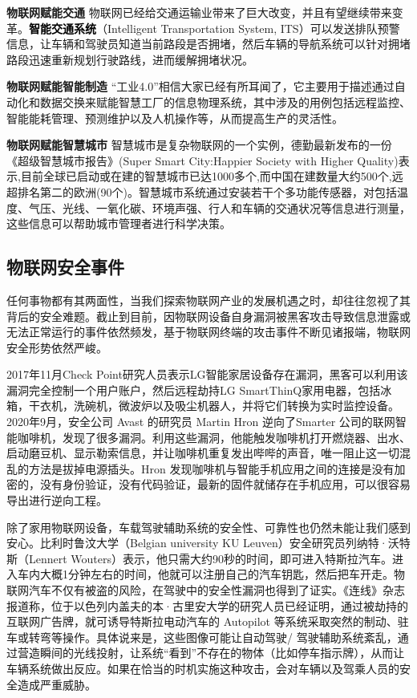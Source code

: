 \textcolor{myblue}{\textbf{物联网赋能交通}}\quad
物联网已经给交通运输业带来了巨大改变，并且有望继续带来变革。\textcolor{black}{\textbf{智能交通系统}}（Intelligent Transportation System, ITS）可以发送排队预警信息，让车辆和驾驶员知道当前路段是否拥堵，然后车辆的导航系统可以针对拥堵路段迅速重新规划行驶路线，进而缓解拥堵状况。

\textcolor{myblue}{\textbf{物联网赋能智能制造}}\quad
“工业4.0”相信大家已经有所耳闻了，它主要用于描述通过自动化和数据交换来赋能智慧工厂的信息物理系统，其中涉及的用例包括远程监控、智能能耗管理、预测维护以及人机操作等，从而提高生产的灵活性。

\textcolor{myblue}{\textbf{物联网赋能智慧城市}}\quad
智慧城市是复杂物联网的一个实例，德勤最新发布的一份《超级智慧城市报告》(Super Smart City:Happier Society with Higher Quality)表示,目前全球已启动或在建的智慧城市已达1000多个,而中国在建数量大约500个,远超排名第二的欧洲(90个)。智慧城市系统通过安装若干个多功能传感器，对包括温度、气压、光线、一氧化碳、环境声强、行人和车辆的交通状况等信息进行测量，这些信息可以帮助城市管理者进行科学决策。


\subsection{物联网安全事件}
\label{computer}
任何事物都有其两面性，当我们探索物联网产业的发展机遇之时，却往往忽视了其背后的安全难题。截止到目前，因物联网设备自身漏洞被黑客攻击导致信息泄露或无法正常运行的事件依然频发，基于物联网终端的攻击事件不断见诸报端，物联网安全形势依然严峻。

2017年11月Check Point研究人员表示LG智能家居设备存在漏洞，黑客可以利用该漏洞完全控制一个用户账户，然后远程劫持LG SmartThinQ家用电器，包括冰箱，干衣机，洗碗机，微波炉以及吸尘机器人，并将它们转换为实时监控设备。2020年9月，安全公司 Avast 的研究员 Martin Hron 逆向了Smarter 公司的联网智能咖啡机，发现了很多漏洞。利用这些漏洞，他能触发咖啡机打开燃烧器、出水、启动磨豆机、显示勒索信息，并让咖啡机重复发出哔哔的声音，唯一阻止这一切混乱的方法是拔掉电源插头。Hron 发现咖啡机与智能手机应用之间的连接是没有加密的，没有身份验证，没有代码验证，最新的固件就储存在手机应用，可以很容易导出进行逆向工程。

除了家用物联网设备，车载驾驶辅助系统的安全性、可靠性也仍然未能让我们感到安心。比利时鲁汶大学（Belgian university KU Leuven）安全研究员列纳特·沃特斯（Lennert Wouters）表示，他只需大约90秒的时间，即可进入特斯拉汽车。进入车内大概1分钟左右的时间，他就可以注册自己的汽车钥匙，然后把车开走。物联网汽车不仅有被盗的风险，在驾驶中的安全性漏洞也得到了证实。《连线》杂志报道称，位于以色列内盖夫的本·古里安大学的研究人员已经证明，通过被劫持的互联网广告牌，就可诱导特斯拉电动汽车的 Autopilot 等系统采取突然的制动、驻车或转弯等操作。具体说来是，这些图像可能让自动驾驶/ 驾驶辅助系统紊乱，通过营造瞬间的光线投射，让系统“看到”不存在的物体（比如停车指示牌），从而让车辆系统做出反应。如果在恰当的时机实施这种攻击，会对车辆以及驾乘人员的安全造成严重威胁。

